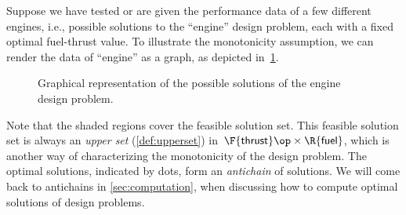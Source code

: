 \begin{example}
Suppose we have tested or are given the performance data of a few different engines, i.e., possible solutions to the ``engine'' design problem, each with a fixed optimal fuel-thrust value. To illustrate the monotonicity assumption, we can render the data of ``engine'' as a graph, as depicted in~\cref{fig:solenginedp}.
\begin{figure}[h!]
\begin{center}
\end{center}
\caption{Graphical representation of the possible solutions of the engine design problem. \label{fig:solenginedp}}
\end{figure}

Note that the shaded regions cover the feasible solution set. This feasible solution set is always an \emph{upper set} (\cref{def:upperset}) in~$\F{\mathsf{thrust}}\op \times \R{\mathsf{fuel}}$, which is another way of characterizing the monotonicity of the design problem. The optimal solutions, indicated by dots, form an \emph{antichain} of solutions. We will come back to antichains in \cref{sec:computation}, when discussing how to compute optimal solutions of design problems.
\end{example}



